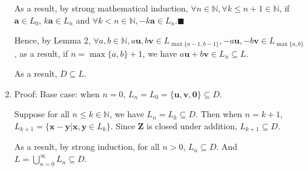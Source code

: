 \documentclass[11pt]{article}
\begin{document}
\begin{solution}
\begin{enumerate}[1.]
			As a result, by strong mathematical induction, $\forall n \in \mathbb{N}, \forall k \leq n + 1 \in \mathbb{N}$, if $\mathbf{a} \in L_0$, $k\mathbf{a} \in L_n$ and $\forall k < n \in \mathbb{N}, -k\mathbf{a} \in L_n$.$\blacksquare$
			
			Hence, by Lemma 2, $\forall a, b\in \mathbb{N}, a\mathbf{u}, b\mathbf{v} \in L_{\max\{a - 1, b - 1\}}, -a\mathbf{u}, -b\mathbf{v} \in L_{\max\{a, b\}}$, as a result, if $n = \max\{a, b\} + 1$, we have $a\mathbf{u} + b\mathbf{v} \in L_n \subseteq L$.
			
			As a result, $D \subseteq L$.
	
	\item Proof:
			Base case: when $n = 0$, $L_n = L_0 = \{\mathbf{u, v, 0}\} \subseteq D$.
			
			Suppose for all $n \leq k \in \mathbb{N}$, we have $L_n = L_k \subseteq D$. Then when $n = k + 1$, $L_{k + 1} = \{\mathbf{x - y} | \mathbf{x, y} \in L_k\}$. Since $\mathbf{Z}$ is closed under addition, $L_{k + 1} \subseteq D$.
			
			As a result, by strong induction, for all $n > 0$, $L_n \subseteq D$. And $L = \bigcup_{n = 0}^{\infty}L_n \subseteq D$.
\end{enumerate}
\end{solution}
\end{document}
